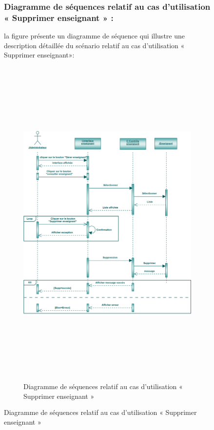 \documentclass[12 pt]{report}
\begin{document}
\begin{figure}[h]
\begin{center}
\subsubsection{Diagramme de séquences relatif au cas d’utilisation « Supprimer enseignant » :}
la figure   présente un diagramme de séquence qui illustre une description détaillée du scénario relatif au cas d’utilisation «  Supprimer enseignant»: 
{\begin{figure}[h]
 \begin{center}
\includegraphics[width= 18cm ,height=  17cm]{sec_sup_ens.PNG}
\caption{Diagramme de séquences relatif au cas d’utilisation « Supprimer enseignant »}

\end{center}
\end{figure}}
\newpage

\end{center}
\end{figure}
\end{document}
